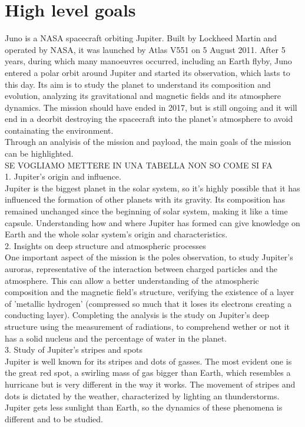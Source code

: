 \section{High level goals}
\label{sec:goals}
Juno is a NASA spacecraft orbiting Jupiter. Built by Lockheed Martin and operated by NASA, it was launched by Atlas V551 on 5 August 2011. After 5 years, during which many manoeuvres occurred, including an Earth flyby, Juno entered a polar orbit around Jupiter and started its observation, which lasts to this day. Its aim is to study the planet to understand its composition and evolution, analyzing its gravitational and magnetic fields and its atmosphere dynamics. The mission should have ended in 2017, but is still ongoing and it will end in a deorbit destroying the spacecraft into the planet's atmosphere to avoid containating the environment. 
\\

Through an analyisis of the mission and payload, the main goals of the mission can be highlighted. \\


SE VOGLIAMO METTERE IN UNA TABELLA NON SO COME SI FA \\

1. Jupiter's origin and influence. \\
Jupiter is the biggest planet in the solar system, so it's highly possible that it has influenced the formation of other planets with its gravity. Its composition has remained unchanged since the beginning of solar system, making it like a time capsule. Understanding how and where Jupiter has formed can give knowledge on Earth and the whole solar system's origin and characteristics.\\

2. Insights on deep structure and atmospheric processes\\
One important aspect of the mission is the poles observation, to study Jupiter's auroras, representative of the interaction between charged particles and the atmosphere. This can allow a better understanding of the atmospheric composition and the magnetic field's structure, verifying the existence of a layer of 'metallic hydrogen' (compressed so much that it loses its electrons creating a conducting layer). Completing the analysis is the study on Jupiter's deep structure using the measurement of radiations, to comprehend wether or not it has a solid nucleus and the percentage of water in the planet.\\

3. Study of Jupiter's stripes and spots\\
Jupiter is well known for its stripes and dots of gasses. The most evident one is the great red spot, a swirling mass of gas bigger than Earth, which resembles a hurricane but is very different in the way it works. The movement of stripes and dots is dictated by the weather, characterized by lighting an thunderstorms. Jupiter gets less sunlight than Earth, so the dynamics of these phenomena is different and to be studied. 






